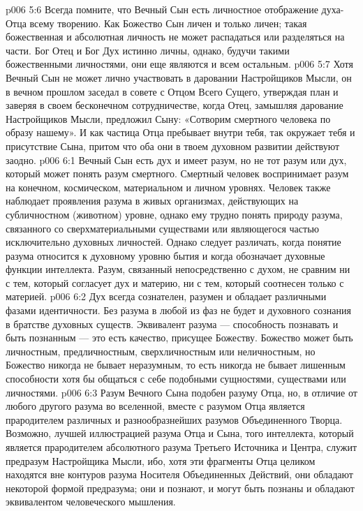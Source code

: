 \vs p006 5:6 Всегда помните, что Вечный Сын есть личностное отображение духа\hyp{}Отца всему творению. Как Божество Сын личен и только личен; такая божественная и абсолютная личность не может распадаться или разделяться на части. Бог Отец и Бог Дух истинно личны, однако, будучи такими божественными личностями, они еще являются и всем остальным.
\vs p006 5:7 Хотя Вечный Сын не может лично участвовать в даровании Настройщиков Мысли, он в вечном прошлом заседал в совете с Отцом Всего Сущего, утверждая план и заверяя в своем бесконечном сотрудничестве, когда Отец, замышляя дарование Настройщиков Мысли, предложил Сыну: «Сотворим смертного человека по образу нашему». И как частица Отца пребывает внутри тебя, так окружает тебя и присутствие Сына, притом что оба они в твоем духовном развитии действуют заодно.
\vs p006 6:1 Вечный Сын есть дух и имеет разум, но не тот разум или дух, который может понять разум смертного. Смертный человек воспринимает разум на конечном, космическом, материальном и личном уровнях. Человек также наблюдает проявления разума в живых организмах, действующих на субличностном (животном) уровне, однако ему трудно понять природу разума, связанного со сверхматериальными существами или являющегося частью исключительно духовных личностей. Однако следует различать, когда понятие разума относится к духовному уровню бытия и когда обозначает духовные функции интеллекта. Разум, связанный непосредственно с духом, не сравним ни с тем, который согласует дух и материю, ни с тем, который соотнесен только с материей.
\vs p006 6:2 Дух всегда сознателен, разумен и обладает различными фазами идентичности. Без разума в любой из фаз не будет и духовного сознания в братстве духовных существ. Эквивалент разума --- способность познавать и быть познанным --- это есть качество, присущее Божеству. Божество может быть личностным, предличностным, сверхличностным или неличностным, но Божество никогда не бывает неразумным, то есть никогда не бывает лишенным способности хотя бы общаться с себе подобными сущностями, существами или личностями.
\vs p006 6:3 Разум Вечного Сына подобен разуму Отца, но, в отличие от любого другого разума во вселенной, вместе с разумом Отца является прародителем различных и разнообразнейших разумов Объединенного Творца. Возможно, лучшей иллюстрацией разума Отца и Сына, того интеллекта, который является прародителем абсолютного разума Третьего Источника и Центра, служит предразум Настройщика Мысли, ибо, хотя эти фрагменты Отца целиком находятся вне контуров разума Носителя Объединенных Действий, они обладают некоторой формой предразума; они и познают, и могут быть познаны и обладают эквивалентом человеческого мышления.
